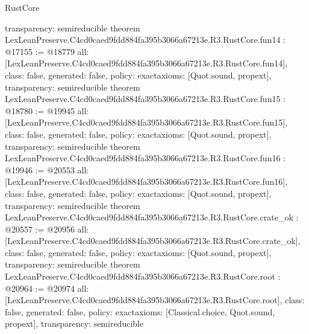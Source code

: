 \begin{lexlean}{RustCore}
\begin{coremodule}
{  transparency: semireducible
}
theorem LexLeanPreserve.C4cd0caed9fdd884fa395b3066a67213e.R3.RustCore.fun14 : @17155 := @18779 {
  all: [LexLeanPreserve.C4cd0caed9fdd884fa395b3066a67213e.R3.RustCore.fun14],
  class: false,
  generated: false,
  policy: exact{axioms: [Quot.sound, propext]},
  transparency: semireducible
}
theorem LexLeanPreserve.C4cd0caed9fdd884fa395b3066a67213e.R3.RustCore.fun15 : @18780 := @19945 {
  all: [LexLeanPreserve.C4cd0caed9fdd884fa395b3066a67213e.R3.RustCore.fun15],
  class: false,
  generated: false,
  policy: exact{axioms: [Quot.sound, propext]},
  transparency: semireducible
}
theorem LexLeanPreserve.C4cd0caed9fdd884fa395b3066a67213e.R3.RustCore.fun16 : @19946 := @20553 {
  all: [LexLeanPreserve.C4cd0caed9fdd884fa395b3066a67213e.R3.RustCore.fun16],
  class: false,
  generated: false,
  policy: exact{axioms: [Quot.sound, propext]},
  transparency: semireducible
}
theorem LexLeanPreserve.C4cd0caed9fdd884fa395b3066a67213e.R3.RustCore.crate_ok : @20557 := @20956 {
  all: [LexLeanPreserve.C4cd0caed9fdd884fa395b3066a67213e.R3.RustCore.crate_ok],
  class: false,
  generated: false,
  policy: exact{axioms: [Quot.sound, propext]},
  transparency: semireducible
}
theorem LexLeanPreserve.C4cd0caed9fdd884fa395b3066a67213e.R3.RustCore.root : @20964 := @20974 {
  all: [LexLeanPreserve.C4cd0caed9fdd884fa395b3066a67213e.R3.RustCore.root],
  class: false,
  generated: false,
  policy: exact{axioms: [Classical.choice, Quot.sound, propext]},
  transparency: semireducible
}


\end{coremodule}
\end{lexlean}
